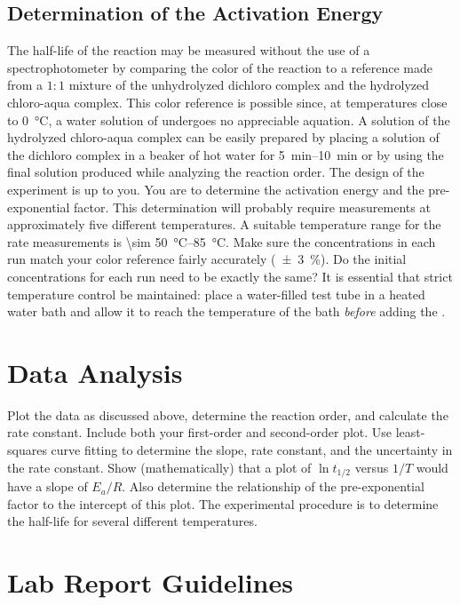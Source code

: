 \subsection{Determination of the Activation Energy}

The half-life of the reaction may be measured without the use of a spectrophotometer by comparing the color of the reaction to a reference made from a \(1{:}1\) mixture of the unhydrolyzed dichloro complex and the hydrolyzed chloro-aqua complex. 
This color reference is possible since, at temperatures close to \qty{0}{\celsius}, a water solution of  undergoes no appreciable aquation. 
A solution of the hydrolyzed chloro-aqua complex can be easily prepared by placing a solution of the dichloro complex in a beaker of hot water for \qtyrange{5}{10}{\minute} or by using the final solution  produced while analyzing the reaction order. 
The design of the experiment is up to you. 
You are to determine the activation energy and the pre-exponential factor. 
This determination will probably require measurements at approximately five different temperatures. 
A suitable temperature range for the rate measurements is \qtyrange{\sim 50}{85}{\celsius}. 
Make sure the concentrations in each run match your color reference fairly accurately (\qty{\pm3}{\percent}). 
Do the initial concentrations for each run need to be exactly the same?
It is essential that strict temperature control be maintained: place a water-filled test tube in a heated water bath and allow it to reach the temperature of the bath \emph{before} adding the . 

\section{Data Analysis}
\label{sec:data_analysis}

Plot the data as discussed above, determine the reaction order, and calculate the rate constant. 
Include both your first-order and second-order plot. 
Use least-squares curve fitting to determine the slope, rate constant, and the uncertainty in the rate constant.
Show (mathematically) that a plot of \(\ln{t_{1/2}}\) versus \(1/T\) would have a slope of \(E_a/R\). 
Also determine the relationship of the pre-exponential factor to the intercept of this plot. 
The experimental procedure is to determine the half-life for several different temperatures.

\section{Lab Report Guidelines} %
\label{sec:lab_report_guidelines}

